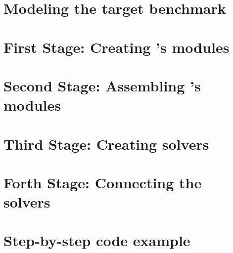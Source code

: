 

\section{Modeling the target benchmark}
\label{sec:model}



\section{First Stage: Creating \posl's modules}
\label{sec:1ststage}



\section{Second Stage: Assembling \posl's modules}
\label{sec:2ndstage}



\section{Third Stage: Creating \posl{} solvers}
\label{sec:3rdstage}



\section{Forth Stage: Connecting the solvers}
\label{sec:4thstage}



\section{Step-by-step \posl{} code example}


